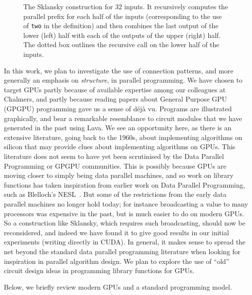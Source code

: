 \begin{figure}
\begin{center}
\caption{The Sklansky construction for $32$ inputs. 
It recursively computes the parallel prefix for each half of the inputs (corresponding to the use of {\tt two} in the definition) and then combines the last output of the lower (left) half with each of the outputs of the upper (right) half. The dotted box outlines the recursive call on the lower half of the inputs.}\label{fig:skl32}
\end{center}
\end{figure}

In this work, we plan to investigate the use of connection patterns, and more generally an emphasis on {\em structure}, in parallel programming.
We have chosen to target GPUs partly because of available expertise among our colleagues at Chalmers, and partly because reading papers about General Purpose GPU (GPGPU) programming gave us a sense of d{\'e}j\`a vu. Programs are illustrated graphically, and bear a remarkable resemblance to circuit modules that we have
generated in the past using Lava. We see an opportunity here, as there is an extensive literature, going back to the 1960s, about implementing algorithms on silicon that may provide clues
about implementing algorithms on GPUs. This literature does not seem to have yet been scrutinised by the Data Parallel Programming or GPGPU communities.
This is possibly because GPUs are moving closer to simply being data parallel machines, and so work on library functions has taken inspiration from earlier work on Data Parallel Programming, such as Blelloch's NESL~\cite{NESL}. But some of the restrictions from the early data parallel machines no longer hold today; for instance broadcasting a value to many processors was expensive in the past, but is much easier to do on modern GPUs. So a construction like Sklansky, which requires such broadcasting, should now be reconsidered, and indeed we have found it to give good results in our initial experiments (writing directly in CUDA). In general, it makes sense to spread the net beyond the standard data parallel programming literature when looking for inspiration in parallel algorithm design. We plan to explore the use of ``old'' circuit design ideas in programming library functions for GPUs.

Below, we briefly review modern GPUs and a standard programming model.




